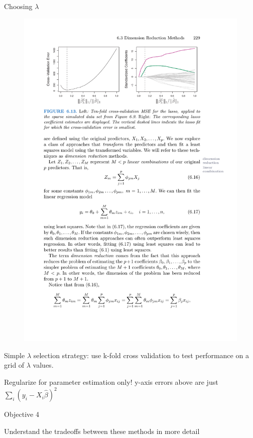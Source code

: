 \documentclass[mathserif, handout, aspectratio=169]{beamer}
\begin{document}
\begin{frame}{Choosing $\lambda$}
\begin{figure}
\includegraphics[scale=.85]{lasso-tenfold}
\end{figure}

\pause

Simple $\lambda$ selection strategy: use k-fold cross validation to test performance on a grid of $\lambda$ values. 

\vspace{5mm}

Regularize for parameter estimation only!  y-axis errors above are just $\sum_i (y_i-X_i\hat{\beta})^2$

\end{frame}

\begin{frame}{Objective 4}

Understand the tradeoffs between these methods in more detail

\end{frame}
\end{document}
